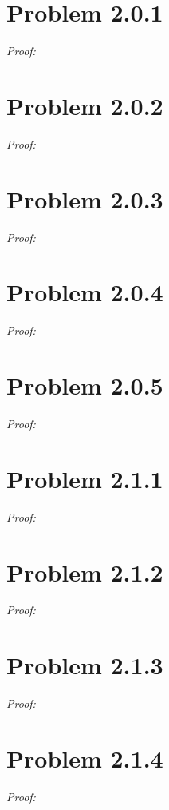 \documentclass[11pt]{article}
\theoremstyle{definition}
\theoremstyle{remark}
\theoremstyle{problem}
\begin{document}
\newpage
\tableofcontents
\newpage

\section{Problem 2.0.1}
\textit{Proof:} 
\newpage

\section{Problem 2.0.2}
\textit{Proof:} 
\newpage

\section{Problem 2.0.3}
\textit{Proof:} 
\newpage

\section{Problem 2.0.4}
\textit{Proof:} 
\newpage

\section{Problem 2.0.5}
\textit{Proof:} 
\newpage

\section{Problem 2.1.1}
\textit{Proof:} 
\newpage

\section{Problem 2.1.2}
\textit{Proof:} 
\newpage

\section{Problem 2.1.3}
\textit{Proof:} 
\newpage

\section{Problem 2.1.4}
\textit{Proof:} 
\newpage
\end{document}
